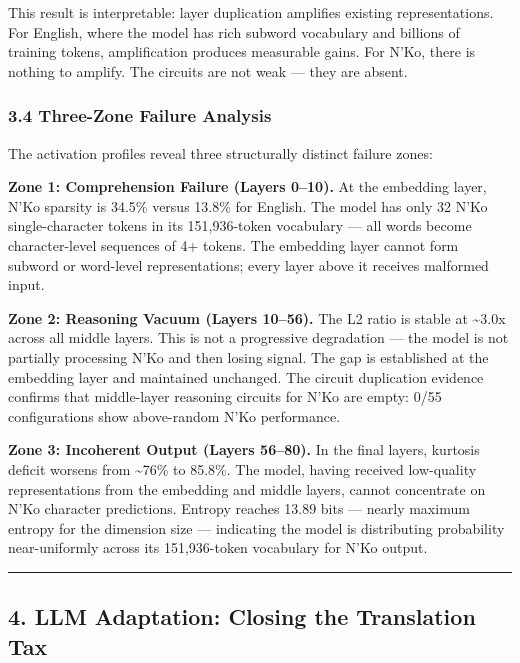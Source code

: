 \documentclass[
]{article}
\begin{document}
This result is interpretable: layer duplication amplifies existing
representations. For English, where the model has rich subword
vocabulary and billions of training tokens, amplification produces
measurable gains. For N'Ko, there is nothing to amplify. The circuits
are not weak --- they are absent.

\subsubsection{3.4 Three-Zone Failure
Analysis}\label{three-zone-failure-analysis}

The activation profiles reveal three structurally distinct failure
zones:

\textbf{Zone 1: Comprehension Failure (Layers 0--10).} At the embedding
layer, N'Ko sparsity is 34.5\% versus 13.8\% for English. The model has
only 32 N'Ko single-character tokens in its 151,936-token vocabulary ---
all words become character-level sequences of 4+ tokens. The embedding
layer cannot form subword or word-level representations; every layer
above it receives malformed input.

\textbf{Zone 2: Reasoning Vacuum (Layers 10--56).} The L2 ratio is
stable at \textasciitilde3.0x across all middle layers. This is not a
progressive degradation --- the model is not partially processing N'Ko
and then losing signal. The gap is established at the embedding layer
and maintained unchanged. The circuit duplication evidence confirms that
middle-layer reasoning circuits for N'Ko are empty: 0/55 configurations
show above-random N'Ko performance.

\textbf{Zone 3: Incoherent Output (Layers 56--80).} In the final layers,
kurtosis deficit worsens from \textasciitilde76\% to 85.8\%. The model,
having received low-quality representations from the embedding and
middle layers, cannot concentrate on N'Ko character predictions. Entropy
reaches 13.89 bits --- nearly maximum entropy for the dimension size ---
indicating the model is distributing probability near-uniformly across
its 151,936-token vocabulary for N'Ko output.

\begin{center}\rule{0.5\linewidth}{0.5pt}\end{center}

\subsection{4. LLM Adaptation: Closing the Translation
Tax}\label{llm-adaptation-closing-the-translation-tax}
\end{document}
